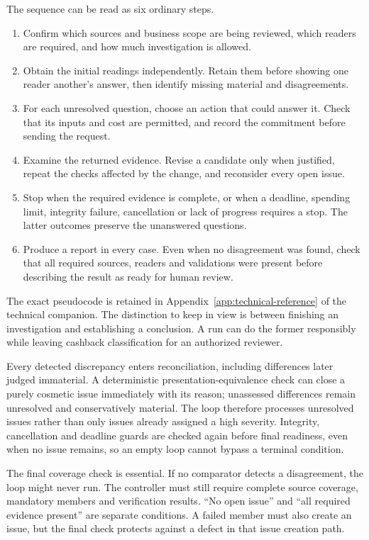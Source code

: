 The sequence can be read as six ordinary steps.
\begin{enumerate}
\item Confirm which sources and business scope are being reviewed, which readers
      are required, and how much investigation is allowed.
\item Obtain the initial readings independently. Retain them before showing one
      reader another's answer, then identify missing material and disagreements.
\item For each unresolved question, choose an action that could answer it. Check
      that its inputs and cost are permitted, and record the commitment before
      sending the request.
\item Examine the returned evidence. Revise a candidate only when justified,
      repeat the checks affected by the change, and reconsider every open issue.
\item Stop when the required evidence is complete, or when a deadline, spending
      limit, integrity failure, cancellation or lack of progress requires a stop.
      The latter outcomes preserve the unanswered questions.
\item Produce a report in every case. Even when no disagreement was found, check
      that all required sources, readers and validations were present before
      describing the result as ready for human review.
\end{enumerate}

The exact pseudocode is retained in Appendix~\ref{app:technical-reference} of the technical companion.
The distinction to keep in view is between finishing an investigation and
establishing a conclusion. A run can do the former responsibly while leaving
cashback classification for an authorized reviewer.



Every detected discrepancy enters reconciliation, including differences later
judged immaterial. A deterministic presentation-equivalence check can close a
purely cosmetic issue immediately with its reason; unassessed differences remain
unresolved and conservatively material. The loop therefore processes unresolved
issues rather than only issues already assigned a high severity. Integrity,
cancellation and deadline guards are checked again before final readiness, even
when no issue remains, so an empty loop cannot bypass a terminal condition.

The final coverage check is essential. If no comparator detects a disagreement,
the loop might never run. The controller must still require complete source
coverage, mandatory members and verification results. ``No open issue'' and
``all required evidence present'' are separate conditions. A failed member must
also create an issue, but the final check protects against a defect in that issue
creation path.


